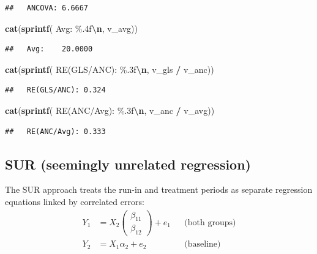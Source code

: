 \documentclass[
  11pt,
]{article}
\newenvironment{Shaded}{\begin{snugshade}}{\end{snugshade}}
\newcommand{\FunctionTok}[1]{\textcolor[rgb]{0.13,0.29,0.53}{\textbf{#1}}}
\newcommand{\NormalTok}[1]{#1}
\newcommand{\SpecialCharTok}[1]{\textcolor[rgb]{0.81,0.36,0.00}{\textbf{#1}}}
\newcommand{\StringTok}[1]{\textcolor[rgb]{0.31,0.60,0.02}{#1}}
\begin{document}
\begin{verbatim}
##   ANCOVA: 6.6667
\end{verbatim}

\begin{Shaded}
\begin{Highlighting}[]
\FunctionTok{cat}\NormalTok{(}\FunctionTok{sprintf}\NormalTok{(}\StringTok{\textquotesingle{}  Avg:    \%.4f}\SpecialCharTok{\textbackslash{}n}\StringTok{\textquotesingle{}}\NormalTok{, v\_avg))}
\end{Highlighting}
\end{Shaded}

\begin{verbatim}
##   Avg:    20.0000
\end{verbatim}

\begin{Shaded}
\begin{Highlighting}[]
\FunctionTok{cat}\NormalTok{(}\FunctionTok{sprintf}\NormalTok{(}\StringTok{\textquotesingle{}  RE(GLS/ANC): \%.3f}\SpecialCharTok{\textbackslash{}n}\StringTok{\textquotesingle{}}\NormalTok{, v\_gls }\SpecialCharTok{/}\NormalTok{ v\_anc))}
\end{Highlighting}
\end{Shaded}

\begin{verbatim}
##   RE(GLS/ANC): 0.324
\end{verbatim}

\begin{Shaded}
\begin{Highlighting}[]
\FunctionTok{cat}\NormalTok{(}\FunctionTok{sprintf}\NormalTok{(}\StringTok{\textquotesingle{}  RE(ANC/Avg): \%.3f}\SpecialCharTok{\textbackslash{}n}\StringTok{\textquotesingle{}}\NormalTok{, v\_anc }\SpecialCharTok{/}\NormalTok{ v\_avg))}
\end{Highlighting}
\end{Shaded}

\begin{verbatim}
##   RE(ANC/Avg): 0.333
\end{verbatim}

\subsection{SUR (seemingly unrelated
regression)}\label{sur-seemingly-unrelated-regression}

The SUR approach treats the run-in and treatment periods as separate
regression equations linked by correlated errors: \begin{align}
  Y_1 &= X_2 \begin{pmatrix}
    \beta_{11} \\ \beta_{12}
  \end{pmatrix} + e_1
  & &\text{(both groups)} \\
  Y_2 &= X_1 \alpha_2 + e_2
  & &\text{(baseline)}
\end{align}
\end{document}
